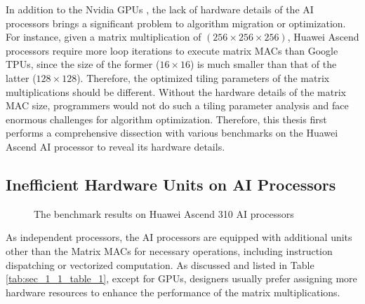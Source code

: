 \documentclass[12pt]{extbook}
\begin{document}
In addition to the Nvidia GPUs \cite{DBLP:journals/corr/abs-1804-06826, DBLP:conf/ppopp/ZhangTXLZC17, DBLP:conf/ics/ZhouTZWS17, DBLP:conf/ispass/RaihanGA19, DBLP:conf/pldi/HongSKRKPRS18, DBLP:conf/cgo/ZhouMSM21}, the lack of hardware details of the AI processors brings a significant problem to algorithm migration or optimization. For instance, given a matrix multiplication of $(256 \times 256 \times 256)$, Huawei Ascend processors require more loop iterations to execute matrix MACs than Google TPUs, since the size of the former ($16 \times 16$) is much smaller than that of the latter ($128 \times 128$). Therefore, the optimized tiling parameters of the matrix multiplications should be different. Without the hardware details of the matrix MAC size, programmers would not do such a tiling parameter analysis and face enormous challenges for algorithm optimization. Therefore, this thesis first performs a comprehensive dissection with various benchmarks on the Huawei Ascend AI processor to reveal its hardware details.

\subsection{Inefficient Hardware Units on AI Processors \label{sec_1_2_2}}

\begin{figure}[tbp]
    \caption{The benchmark results on Huawei Ascend 310 AI processors}
    \label{fig:benchmark}
    \end{figure}

As independent processors, the AI processors are equipped with additional units other than the Matrix MACs for necessary operations, including instruction dispatching or vectorized computation. As discussed and listed in Table \ref{tab:sec_1_1_table_1}, except for GPUs, designers usually prefer assigning more hardware resources to enhance the performance of the matrix multiplications. 
\end{document}
